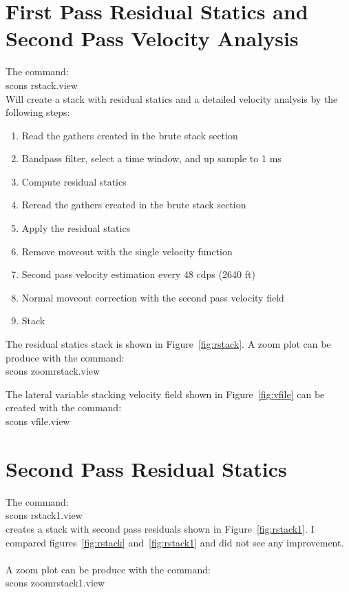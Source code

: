 \section{First Pass Residual Statics and Second Pass Velocity Analysis}
The command:\\
scons rstack.view\\
Will create a stack with residual statics and a detailed velocity analysis 
by the following steps:
\begin{enumerate}
\item Read the gathers created in the brute stack section
\item Bandpass filter, select a time window, and up sample to 1 ms
\item Compute residual statics
\item Reread the gathers created in the brute stack section
\item Apply the residual statics
\item Remove moveout with the single velocity function 
\item Second pass velocity estimation every 48 cdps (2640 ft)
\item Normal moveout correction with the second pass velocity field 
\item Stack
\end{enumerate}

The residual statics stack is shown in Figure~\ref{fig:rstack}.  A zoom 
plot can be produce with the command:\\
scons zoomrstack.view


The lateral variable stacking velocity field shown in Figure~\ref{fig:vfile} 
can be created with the command:\\
scons vfile.view


\section{Second Pass Residual Statics}
The command:\\
scons rstack1.view\\
creates a stack with second pass residuals shown in Figure~\ref{fig:rstack1}.  
I compared figures~\ref{fig:rstack} and~\ref{fig:rstack1} and did not see 
any improvement.\\
\\  
A zoom plot can be produce with the command:\\
scons zoomrstack1.view

